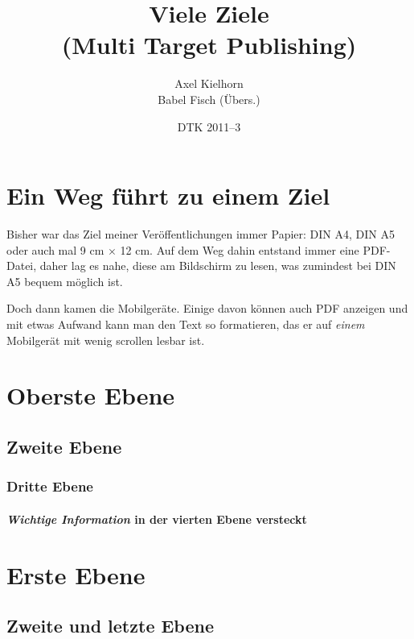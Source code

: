 \documentclass{article}
\title{Viele Ziele\\ (Multi Target Publishing)}
\author{Axel Kielhorn\\Babel Fisch (Übers.)}
\date{DTK 2011--3}
\begin{document}
\maketitle

\section{Ein Weg führt zu einem Ziel}

Bisher war das Ziel meiner Veröffentlichungen immer Papier: DIN A4, DIN
A5 oder auch mal 9 cm $\times$ 12 cm. Auf dem Weg dahin entstand immer
eine PDF-Datei, daher lag es nahe, diese am Bildschirm zu lesen, was
zumindest bei DIN A5 bequem möglich ist.

Doch dann kamen die Mobilgeräte. Einige davon können auch PDF anzeigen
und mit etwas Aufwand kann man den Text so formatieren, das er auf
\emph{einem} Mobilgerät mit wenig scrollen lesbar ist.

\section{Oberste Ebene}

\subsection{Zweite Ebene}

\subsubsection{Dritte Ebene}

\paragraph{\emph{Wichtige Information} in der vierten Ebene versteckt}

\section{Erste Ebene}

\subsection{Zweite und letzte Ebene}
\end{document}
